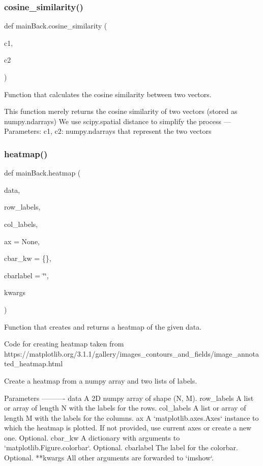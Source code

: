 \subsubsection{\texorpdfstring{cosine\+\_\+similarity()}{cosine\_similarity()}}
{\footnotesize\ttfamily def main\+Back.\+cosine\+\_\+similarity (\begin{DoxyParamCaption}\item[{}]{c1,  }\item[{}]{c2 }\end{DoxyParamCaption})}



Function that calculates the cosine similarity between two vectors. 

\begin{DoxyVerb}This function merely returns the cosine similarity of two vectors (stored as numpy.ndarrays)
We use scipy.spatial distance to simplify the process
---
Parameters:
c1, c2: numpy.ndarrays that represent the two vectors
\end{DoxyVerb}
 \mbox{\label{namespacemain_back_a6e34e76908b8cfd5fda4efaaf6737d55}} 
\subsubsection{\texorpdfstring{heatmap()}{heatmap()}}
{\footnotesize\ttfamily def main\+Back.\+heatmap (\begin{DoxyParamCaption}\item[{}]{data,  }\item[{}]{row\+\_\+labels,  }\item[{}]{col\+\_\+labels,  }\item[{}]{ax = {\ttfamily None},  }\item[{}]{cbar\+\_\+kw = {\ttfamily \{\}},  }\item[{}]{cbarlabel = {\ttfamily \char`\"{}\char`\"{}},  }\item[{}]{kwargs }\end{DoxyParamCaption})}



Function that creates and returns a heatmap of the given data. 

\begin{DoxyVerb}Code for creating heatmap taken from https://matplotlib.org/3.1.1/gallery/images_contours_and_fields/image_annotated_heatmap.html

Create a heatmap from a numpy array and two lists of labels.

Parameters
----------
data
    A 2D numpy array of shape (N, M).
row_labels
    A list or array of length N with the labels for the rows.
col_labels
    A list or array of length M with the labels for the columns.
ax
    A `matplotlib.axes.Axes` instance to which the heatmap is plotted.  If
    not provided, use current axes or create a new one.  Optional.
cbar_kw
    A dictionary with arguments to `matplotlib.Figure.colorbar`.  Optional.
cbarlabel
    The label for the colorbar.  Optional.
**kwargs
    All other arguments are forwarded to `imshow`.
\end{DoxyVerb}
 

